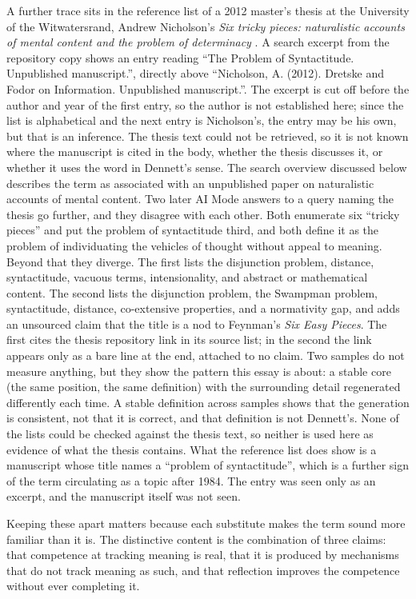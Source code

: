 \documentclass[11pt]{article}
\begin{document}
A further trace sits in the reference list of a 2012 master's thesis at the University of the Witwatersrand, Andrew Nicholson's \emph{Six tricky pieces: naturalistic accounts of mental content and the problem of determinacy} \cite{nicholson2012}. A search excerpt from the repository copy shows an entry reading ``The Problem of Syntactitude. Unpublished manuscript.'', directly above ``Nicholson, A. (2012). Dretske and Fodor on Information. Unpublished manuscript.''. The excerpt is cut off before the author and year of the first entry, so the author is not established here; since the list is alphabetical and the next entry is Nicholson's, the entry may be his own, but that is an inference. The thesis text could not be retrieved, so it is not known where the manuscript is cited in the body, whether the thesis discusses it, or whether it uses the word in Dennett's sense. The search overview discussed below describes the term as associated with an unpublished paper on naturalistic accounts of mental content. Two later AI Mode answers to a query naming the thesis go further, and they disagree with each other. Both enumerate six ``tricky pieces'' and put the problem of syntactitude third, and both define it as the problem of individuating the vehicles of thought without appeal to meaning. Beyond that they diverge. The first lists the disjunction problem, distance, syntactitude, vacuous terms, intensionality, and abstract or mathematical content. The second lists the disjunction problem, the Swampman problem, syntactitude, distance, co-extensive properties, and a normativity gap, and adds an unsourced claim that the title is a nod to Feynman's \emph{Six Easy Pieces}. The first cites the thesis repository link in its source list; in the second the link appears only as a bare line at the end, attached to no claim. Two samples do not measure anything, but they show the pattern this essay is about: a stable core (the same position, the same definition) with the surrounding detail regenerated differently each time. A stable definition across samples shows that the generation is consistent, not that it is correct, and that definition is not Dennett's. None of the lists could be checked against the thesis text, so neither is used here as evidence of what the thesis contains. What the reference list does show is a manuscript whose title names a ``problem of syntactitude'', which is a further sign of the term circulating as a topic after 1984. The entry was seen only as an excerpt, and the manuscript itself was not seen.

Keeping these apart matters because each substitute makes the term sound more familiar than it is. The distinctive content is the combination of three claims: that competence at tracking meaning is real, that it is produced by mechanisms that do not track meaning as such, and that reflection improves the competence without ever completing it.
\end{document}
